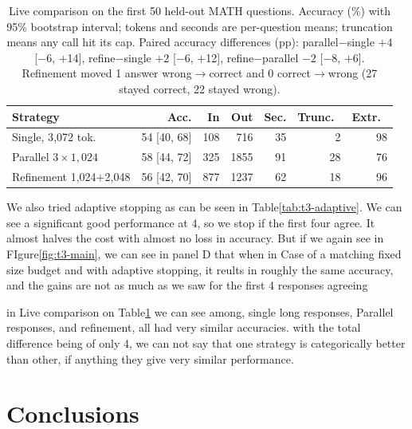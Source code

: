 \documentclass{article}
\begin{document}
\begin{table}[H]
  \centering
  \footnotesize
  \caption{Live comparison on the first 50 held-out MATH questions. Accuracy (\%) with 95\% bootstrap interval; tokens and seconds are per-question means; truncation means any call hit its cap. Paired accuracy differences (pp): parallel$-$single $+4$ [$-$6, $+$14], refine$-$single $+2$ [$-$6, $+$12], refine$-$parallel $-2$ [$-$8, $+$6]. Refinement moved 1 answer wrong$\to$correct and 0 correct$\to$wrong (27 stayed correct, 22 stayed wrong).}
  \label{tab:t3-live}
  \begin{tabular}{lrrrrrr}
    \toprule
    Strategy & Acc. & In & Out & Sec. & Trunc.\ & Extr.\ \\
    \midrule
    Single, 3{,}072 tok. & 54 [40, 68] & 108 & 716 & 35 & 2 & 98 \\
    Parallel $3{\times}1{,}024$ & 58 [44, 72] & 325 & 1855 & 91 & 28 & 76 \\
    Refinement 1{,}024$+$2{,}048 & 56 [42, 70] & 877 & 1237 & 62 & 18 & 96 \\
    \bottomrule
  \end{tabular}
\end{table}

We also tried adaptive stopping as can be seen in Table\ref{tab:t3-adaptive}. We can see a significant good performance at 4, so we stop if the first four agree.
It almost halves the cost with almost no loss in accuracy. But if we again see in FIgure\ref{fig:t3-main}, we can see in panel D that when in Case of a matching fixed size budget and with adaptive
stopping, it reults in roughly the same accuracy, and the gains are not as much as we saw for the first 4 responses agreeing

in Live comparison on Table\ref{tab:t3-live} we can see among, single long responses, Parallel responses, and refinement, all had very similar accuracies.
with the total difference being of only 4, we can not say that one strategy is categorically better than other, if anything they give very similar performance.



\section{Conclusions}
\end{document}
